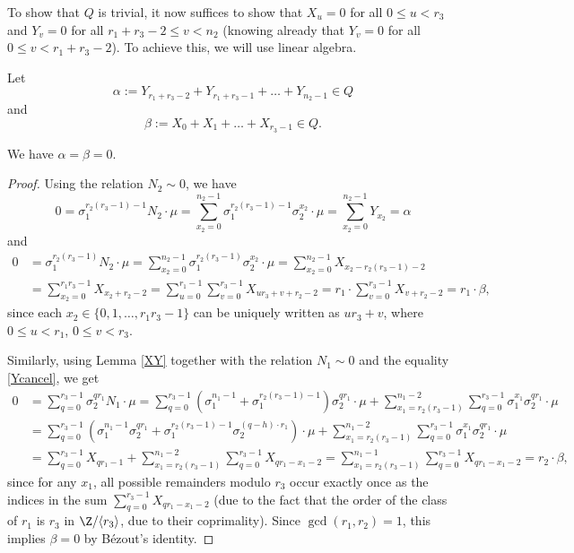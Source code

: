 To show that $Q$ is trivial, it now suffices to show that $X_u=0$ for all $0\leq u< r_3$ and $Y_v=0$ for all $r_1+r_3-2\leq v< n_2$ (knowing already that  $Y_v = 0$ 
for all $0 \le v < r_1 +r_3 - 2$). To achieve this, we will use linear algebra.

%

Let 
\begin{equation*}
\alpha:= Y_{r_1+r_3-2}+Y_{r_1+r_3-1}+\dots+Y_{n_2-1}\in Q
\end{equation*}
and
\begin{equation}\label{beta}
\beta:=X_0+X_1+\dots+X_{r_3-1}\in Q.
\end{equation}

\begin{lemma}\label{AB}
We have $\alpha=\beta=0$.
\end{lemma}
\begin{proof}
Using the relation $N_2\sim 0$, we have $$0=\sigma_1^{r_2(r_3-1)-1}N_2\cdot \mu =\sum_{x_2=0}^{n_2-1}  \sigma_1^{r_2(r_3-1)-1}\sigma_2^{x_2}\cdot \mu= \sum_{x_2=0}^{n_2-1}Y_{x_2}=\alpha$$ and
\begin{align*}
0&= \sigma_1^{r_2(r_3-1)}N_2\cdot \mu=\sum_{x_2=0}^{n_2-1}  \sigma_1^{r_2(r_3-1)}\sigma_2^{x_2}\cdot \mu=\sum_{x_2=0}^{n_2-1}  X_{x_2-r_2(r_3-1)-2}\\
&=\sum_{x_2=0}^{r_1r_3-1}  X_{x_2+r_2-2}=
\sum_{u=0}^{r_1-1}\sum_{v=0}^{r_3-1} X_{ur_3+v+r_2-2}=r_1\cdot \sum_{v=0}^{r_3-1} X_{v+r_2-2}=r_1\cdot \beta,
\end{align*}
since each $x_2\in\{0,1,\dots,r_1r_3-1\}$ can be uniquely written as $ur_3+v$, where $0\leq u<r_1$, $0\leq v<r_3$.%

Similarly, using Lemma \ref{XY} together with the relation $N_1\sim 0$ and the equality \eqref{Ycancel}, %
we get
\begin{align*}
0&= \sum_{q=0}^{r_3-1} \sigma_2^{qr_1}N_1\cdot \mu =\sum_{q=0}^{r_3-1}\left(\sigma_1^{n_1-1}+\sigma_1^{r_2(r_3-1)-1}\right) \sigma_2^{qr_1}\cdot \mu   
+\sum_{x_1=r_2(r_3-1)}^{n_1-2}\sum_{q=0}^{r_3-1} \sigma_1^{x_1}\sigma_2^{qr_1}\cdot \mu\\
&=\sum_{q=0}^{r_3-1}(\sigma_1^{n_1-1}\sigma_2^{qr_1}+\sigma_1^{r_2(r_3-1)-1}\sigma_2^{(q-h)\cdot r_1})\cdot \mu
+\sum_{x_1=r_2(r_3-1)}^{n_1-2}\sum_{q=0}^{r_3-1} \sigma_1^{x_1}\sigma_2^{qr_1}\cdot \mu\\
&=\sum_{q=0}^{r_3-1}X_{qr_1-1}+\sum_{x_1=r_2(r_3-1)}^{n_1-2}\sum_{q=0}^{r_3-1}X_{qr_1-x_1-2}
= \sum_{x_1=r_2(r_3-1)}^{n_1-1}\sum_{q=0}^{r_3-1}X_{qr_1-x_1-2}
=r_2\cdot \beta,
\end{align*}
since for any $x_1$, all possible remainders modulo $r_3$ occur exactly once as the indices in the sum $\sum_{q=0}^{r_3-1}X_{qr_1-x_1-2}$ (due to the fact that the order of the class of $r_1$ is $r_3$ in $\Z/\langle r_3\rangle$, due to their coprimality).
Since $\gcd(r_1,r_2)=1$, this implies $\beta=0$ by Bézout's identity.
\end{proof}

